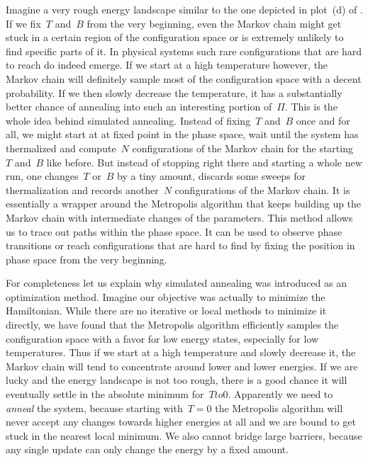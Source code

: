 Imagine a very rough energy landscape similar to the one depicted in plot~(d) of
. If we fix~$T$ and~$B$ from the very beginning, even
the Markov chain might get stuck in a certain region of the configuration space
or is extremely unlikely to find specific parts of it. In physical systems such
rare configurations that are hard to reach do indeed emerge. If we start at a
high temperature however, the Markov chain will definitely sample most of the
configuration space with a decent probability. If we then slowly decrease the
temperature, it has a substantially better chance of annealing into such an
interesting portion of~$\Pi$. This is the whole idea behind simulated annealing.
Instead of fixing~$T$ and~$B$ once and for all, we might start at at fixed point
in the phase space, wait until the system has thermalized and compute~$N$
configurations of the Markov chain for the starting~$T$ and~$B$ like before. But
instead of stopping right there and starting a whole new run, one changes~$T$
or~$B$ by a tiny amount, discards some sweeps for thermalization and records
another~$N$ configurations of the Markov chain. It is essentially a wrapper
around the Metropolis algorithm that keeps building up the Markov chain with
intermediate changes of the parameters. This method allows us to trace out
paths within the phase space. It can be used to observe phase transitions or
reach configurations that are hard to find by fixing the position in phase space
from the very beginning.

For completeness let us explain why simulated annealing was introduced as an
optimization method. Imagine our objective was actually to minimize the
Hamiltonian. While there are no iterative or local methods to minimize it
directly, we have found that the Metropolis algorithm efficiently samples the
configuration space with a favor for low energy states, especially for low
temperatures. Thus if we start at a high temperature and slowly decrease it, the
Markov chain will tend to concentrate around lower and lower energies. If we are
lucky and the energy landscape is not too rough, there is a good chance it will
eventually settle in the absolute minimum for~$T to 0$. Apparently we need to
\emph{anneal} the system, because starting with~$T=0$ the Metropolis algorithm
will never accept any changes towards higher energies at all and we are bound to
get stuck in the nearest local minimum. We also cannot bridge large barriers,
because any single update can only change the energy by a fixed amount.

